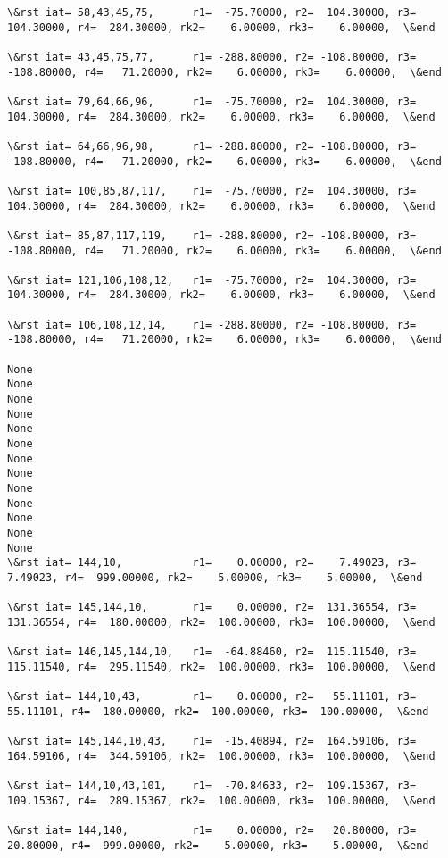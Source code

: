 \documentclass[11pt]{article}
\begin{document}
\begin{Verbatim}[commandchars=\\\{\}]
\&rst iat= 58,43,45,75,      r1=  -75.70000, r2=  104.30000, r3=  104.30000, r4=  284.30000, rk2=    6.00000, rk3=    6.00000,  \&end

\&rst iat= 43,45,75,77,      r1= -288.80000, r2= -108.80000, r3= -108.80000, r4=   71.20000, rk2=    6.00000, rk3=    6.00000,  \&end

\&rst iat= 79,64,66,96,      r1=  -75.70000, r2=  104.30000, r3=  104.30000, r4=  284.30000, rk2=    6.00000, rk3=    6.00000,  \&end

\&rst iat= 64,66,96,98,      r1= -288.80000, r2= -108.80000, r3= -108.80000, r4=   71.20000, rk2=    6.00000, rk3=    6.00000,  \&end

\&rst iat= 100,85,87,117,    r1=  -75.70000, r2=  104.30000, r3=  104.30000, r4=  284.30000, rk2=    6.00000, rk3=    6.00000,  \&end

\&rst iat= 85,87,117,119,    r1= -288.80000, r2= -108.80000, r3= -108.80000, r4=   71.20000, rk2=    6.00000, rk3=    6.00000,  \&end

\&rst iat= 121,106,108,12,   r1=  -75.70000, r2=  104.30000, r3=  104.30000, r4=  284.30000, rk2=    6.00000, rk3=    6.00000,  \&end

\&rst iat= 106,108,12,14,    r1= -288.80000, r2= -108.80000, r3= -108.80000, r4=   71.20000, rk2=    6.00000, rk3=    6.00000,  \&end

None
None
None
None
None
None
None
None
None
None
None
None
None
\&rst iat= 144,10,           r1=    0.00000, r2=    7.49023, r3=    7.49023, r4=  999.00000, rk2=    5.00000, rk3=    5.00000,  \&end

\&rst iat= 145,144,10,       r1=    0.00000, r2=  131.36554, r3=  131.36554, r4=  180.00000, rk2=  100.00000, rk3=  100.00000,  \&end

\&rst iat= 146,145,144,10,   r1=  -64.88460, r2=  115.11540, r3=  115.11540, r4=  295.11540, rk2=  100.00000, rk3=  100.00000,  \&end

\&rst iat= 144,10,43,        r1=    0.00000, r2=   55.11101, r3=   55.11101, r4=  180.00000, rk2=  100.00000, rk3=  100.00000,  \&end

\&rst iat= 145,144,10,43,    r1=  -15.40894, r2=  164.59106, r3=  164.59106, r4=  344.59106, rk2=  100.00000, rk3=  100.00000,  \&end

\&rst iat= 144,10,43,101,    r1=  -70.84633, r2=  109.15367, r3=  109.15367, r4=  289.15367, rk2=  100.00000, rk3=  100.00000,  \&end

\&rst iat= 144,140,          r1=    0.00000, r2=   20.80000, r3=   20.80000, r4=  999.00000, rk2=    5.00000, rk3=    5.00000,  \&end


\end{Verbatim}
\end{document}
